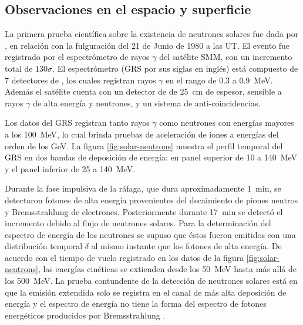 \subsection{Observaciones en el espacio y superficie}

La primera prueba científica sobre la existencia de neutrones solares fue dada por \cite{chupp82}, en relación con la fulguración del \num{21} de Junio de \num{1980} a las  UT. El evento fue registrado por el espectrómetro de rayos $\gamma$ del satélite SMM, con un incremento total de $130\sigma$. El espectrómetro (GRS por sus siglas en inglés) está compuesto de \num{7} detectores de , los cuales registran rayos $\gamma$ en el rango de \num{0.3} a \SI{0.9}{\mega\electronvolt}. Además el satélite cuenta con un detector de  de \SI{25}{\centi\metre} de espesor, sensible a rayos $\gamma$ de alta energía y neutrones, y un sistema de anti-coincidencias.

Los datos del GRS registran tanto rayos $\gamma$ como neutrones con energías mayores a los \SI{100}{\mega\electronvolt}, lo cual brinda pruebas de aceleración de iones a energías del orden de los \si{\giga\electronvolt}. La figura \ref{fig:solar-neutrons} muestra el perfil temporal del GRS en dos bandas de deposición de energía: en panel superior de \num{10} a \SI{140}{\mega\electronvolt} y el panel inferior de \num{25} a \SI{140}{\mega\electronvolt}.

Durante la fase impulsiva de la ráfaga, que dura aproximadamente \SI{1}{\minute}, se detectaron fotones de alta energía provenientes del decaimiento de piones neutros y Bremsstrahlung de electrones. Posteriormente durante \SI{17}{\minute} se detectó el incremento debido al flujo de neutrones solares. Para la determinación del espectro de energía de los neutrones se supuso que éstos fueron emitidos con una distribución temporal $\delta$ al mismo instante que los fotones de alta energía. De acuerdo con el tiempo de vuelo registrado en los datos de la figura \ref{fig:solar-neutrons}, las energías cinéticas se extienden desde los \SI{50}{\mega\electronvolt} hasta más allá de los \SI{500}{\mega\electronvolt}. La prueba contundente de la detección de neutrones solares está en que la emisión extendida solo se registra en el canal de más alta deposición de energía y el espectro de energía no tiene la forma del espectro de fotones energéticos producidos por Bremsstrahlung \cite{dorman}.

